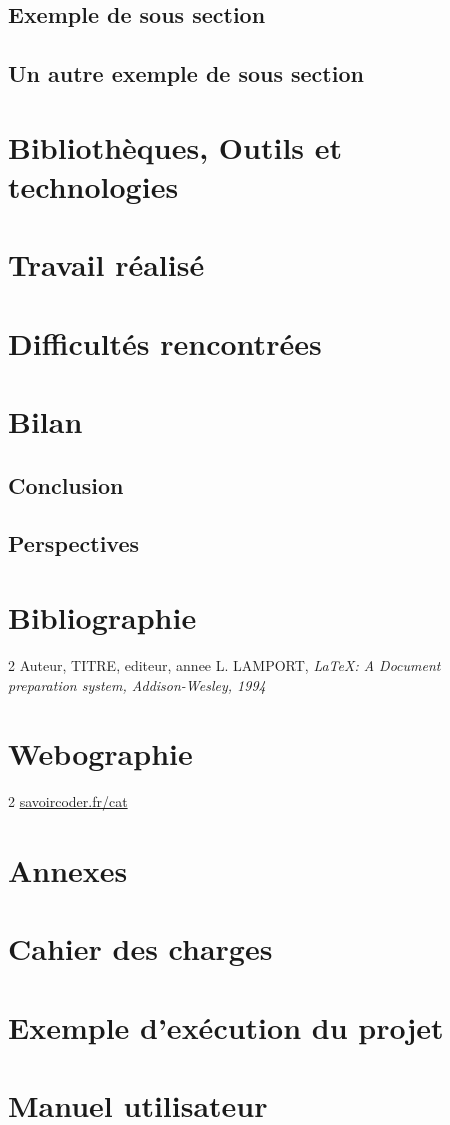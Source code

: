\documentclass[a4paper, 12pt, twoside]{article}
\begin{document}
\subsection{Exemple de sous section}
\subsection{Un autre exemple de sous section}

\section{Bibliothèques, Outils et technologies}
\section{Travail réalisé}
\section{Difficultés rencontrées}
\section{Bilan}
\subsection{Conclusion}
\subsection{Perspectives}



\newpage
\section{Bibliographie}
\renewcommand{\bibname}{}
\renewcommand{\refname}{}
\begin{thebibliography}{2}
	 Auteur, TITRE, editeur, annee
	 L. LAMPORT, {\it \LaTeX : A Document preparation system, Addison-Wesley, 1994}
\end{thebibliography}

\newpage
\section{Webographie}
\begin{thebibliography}{2}
	 \url{savoircoder.fr/cat}
\end{thebibliography}


\newpage
\section{Annexes}
\appendix
\makeatletter
\def\@seccntformat#1{Annexe~\csname the#1\endcsname:\quad}
\makeatother
\section{Cahier des charges}
\section{Exemple d'exécution du projet}
\section{Manuel utilisateur}
\end{document}

